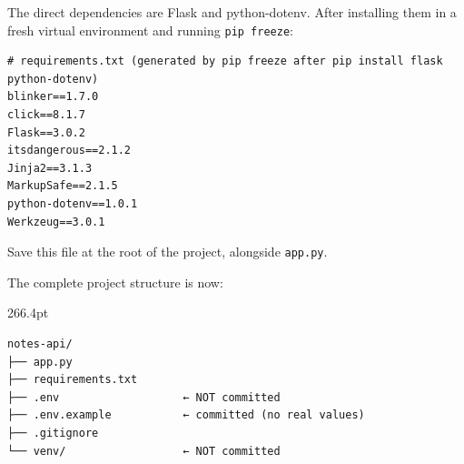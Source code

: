 \begin{codebox}[short]

\begin{Shaded}
\begin{Highlighting}[]
\end{Highlighting}
\end{Shaded}

\end{codebox}

\noindent{}The direct dependencies are Flask and python-dotenv. After installing them in a fresh virtual environment and running \texttt{pip\ freeze}:

\begin{outputbox}[short]
\begin{Verbatim}[fontsize=\codesize, breaklines, breakanywhere, breaksymbolleft={\tiny\textcolor{muted}{$\hookrightarrow$}}]
# requirements.txt (generated by pip freeze after pip install flask python-dotenv)
blinker==1.7.0
click==8.1.7
Flask==3.0.2
itsdangerous==2.1.2
Jinja2==3.1.3
MarkupSafe==2.1.5
python-dotenv==1.0.1
Werkzeug==3.0.1
\end{Verbatim}
\end{outputbox}

\noindent{}Save this file at the root of the project, alongside \texttt{app.py}.

The complete project structure is now:

\begin{diagrambox}[short]{266.4pt}
\begin{Verbatim}[fontsize=\fontsize{9.0}{8.55}\selectfont]
notes-api/
├── app.py
├── requirements.txt
├── .env                   ← NOT committed
├── .env.example           ← committed (no real values)
├── .gitignore
└── venv/                  ← NOT committed
\end{Verbatim}
\end{diagrambox}


